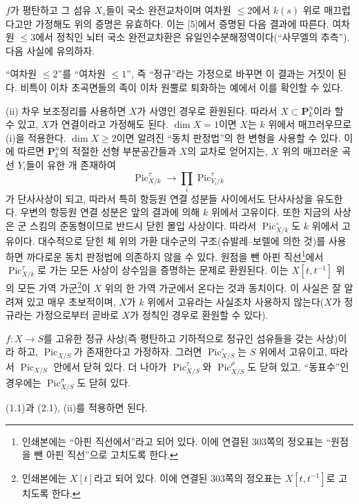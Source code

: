  $f$가 평탄하고 그 섬유 $X_s$들이 국소 완전교차이며
여차원 $\leq2$에서 $k(s)$ 위로 매끄럽다고만 가정해도 위의 증명은 유효하다.
이는 [5]에서 증명된 다음 결과에 따른다. 여차원 $\leq3$에서 정칙인 뇌터
국소 완전교차환은 유일인수분해정역이다(``사무엘의 추측''). 다음 사실에
유의하자.

``여차원 $\leq2$''를 ``여차원 $\leq1$'', 즉 ``정규''라는 가정으로
바꾸면 이 결과는 거짓이 된다. 비특이 이차 초곡면들의 족이 이차 원뿔로
퇴화하는 예에서 이를 확인할 수 있다.

(ii) 차우 보조정리를 사용하면 $X$가 사영인 경우로 환원된다. 따라서
$X\subset\mathbf P_k^n$이라 할 수 있고, $X$가 연결이라고 가정해도 된다.
$\dim X=1$이면 $X$는 $k$ 위에서 매끄러우므로 (i)을 적용한다.
$\dim X\geq2$이면 알려진 ``동치 판정법''의 한 변형을 사용할 수 있다. 이에
따르면 $\mathbf P_k^n$의 적절한 선형 부분공간들과 $X$의 교차로 얻어지는,
$X$ 위의 매끄러운 곡선 $Y_i$들이 유한 개 존재하여
\[
\operatorname{Pic}_{X/k}^\tau\longrightarrow
\prod_i\operatorname{Pic}_{Y_i/k}^\tau
\]
가 단사사상이 되고, 따라서 특히 항등원 연결 성분들 사이에서도 단사사상을
유도한다. 우변의 항등원 연결 성분은 앞의 결과에 의해 $k$ 위에서 고유이다.
또한 지금의 사상은 군 스킴의 준동형이므로 반드시 닫힌 몰입 사상이다. 따라서
$\operatorname{Pic}_{X/k}^\circ$도 $k$ 위에서 고유이다. 대수적으로 닫힌 체
위의 가환 대수군의 구조(슈발레--보렐에 의한 것)를 사용하면 까다로운 동치
판정법에 의존하지 않을 수 있다. 원점을 뺀 아핀 직선\footnote{인쇄본에는
``아핀 직선에서''라고 되어 있다. 이에 연결된 303쪽의 정오표는 ``원점을 뺀
아핀 직선''으로 고치도록 한다.}에서 $\operatorname{Pic}_{X/k}^\tau$로 가는
모든 사상이 상수임을 증명하는 문제로 환원된다. 이는
$X[t,t^{-1}]$ 위의 모든 가역 가군\footnote{인쇄본에는 $X[t]$라고 되어
있다. 이에 연결된 303쪽의 정오표는 $X[t,t^{-1}]$로 고치도록 한다.}이 $X$
위의 한 가역 가군에서 온다는 것과 동치이다. 이 사실은 잘 알려져 있고 매우
초보적이며, $X$가 $k$ 위에서 고유라는 사실조차 사용하지 않는다($X$가
정규라는 가정으로부터 곧바로 $X$가 정칙인 경우로 환원할 수 있다).

 $f:X\longrightarrow S$를 고유한 정규 사상(즉
평탄하고 기하적으로 정규인 섬유들을 갖는 사상)이라 하고,
$\operatorname{Pic}_{X/S}$가 존재한다고 가정하자. 그러면
$\operatorname{Pic}_{X/S}^\circ$는 $S$ 위에서 고유이고, 따라서
$\operatorname{Pic}_{X/S}$ 안에서 닫혀 있다. 더 나아가
$\operatorname{Pic}_{X/S}^\tau$와 $\operatorname{Pic}_{X/S}^\rho$도
닫혀 있고, ``동표수''인 경우에는 $\operatorname{Pic}_{X/S}^\sigma$도
닫혀 있다.

(1.1)과 (2.1), (ii)를 적용하면 된다.

